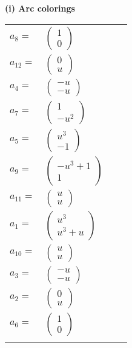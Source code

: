 \documentclass[1p]{elsarticle_modified}
\theoremstyle{definition}
\begin{document}
\flushleft \textbf{(i) Arc colorings}\\
\begin{tabular}{m{7pt} m{180pt} m{7pt} m{180pt} }
\flushright $a_{8}=$&$\begin{pmatrix}1\\0\end{pmatrix}$ \\
\flushright $a_{12}=$&$\begin{pmatrix}0\\u\end{pmatrix}$ \\
\flushright $a_{4}=$&$\begin{pmatrix}- u\\- u\end{pmatrix}$ \\
\flushright $a_{7}=$&$\begin{pmatrix}1\\- u^2\end{pmatrix}$ \\
\flushright $a_{5}=$&$\begin{pmatrix}u^3\\-1\end{pmatrix}$ \\
\flushright $a_{9}=$&$\begin{pmatrix}- u^3+1\\1\end{pmatrix}$ \\
\flushright $a_{11}=$&$\begin{pmatrix}u\\u\end{pmatrix}$ \\
\flushright $a_{1}=$&$\begin{pmatrix}u^3\\u^3+u\end{pmatrix}$ \\
\flushright $a_{10}=$&$\begin{pmatrix}u\\u\end{pmatrix}$ \\
\flushright $a_{3}=$&$\begin{pmatrix}- u\\- u\end{pmatrix}$ \\
\flushright $a_{2}=$&$\begin{pmatrix}0\\u\end{pmatrix}$ \\
\flushright $a_{6}=$&$\begin{pmatrix}1\\0\end{pmatrix}$\\&\end{tabular}
\end{document}

